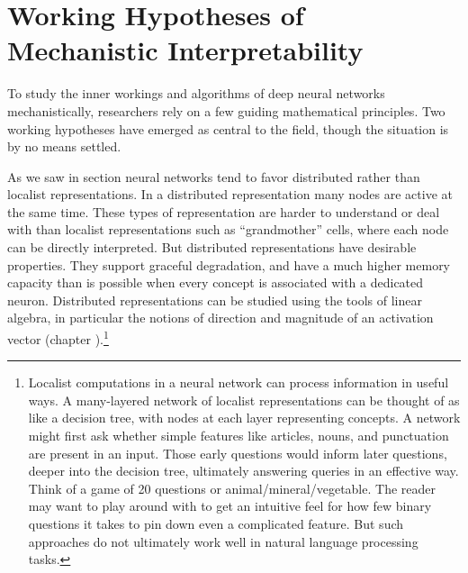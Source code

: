 \section{Working Hypotheses of Mechanistic Interpretability}\label{mechInterpHypotheses}

To study the inner workings and algorithms of deep neural networks
mechanistically, researchers rely on a few guiding mathematical principles. Two
working hypotheses have emerged as central to the field, though the situation
is by no means settled.


As we saw in section  neural networks tend to
favor distributed rather than localist representations. In a distributed
representation many nodes are active at the same time. These types of
representation are harder to understand or deal with than localist
representations such as ``grandmother'' cells, where each node can be directly
interpreted. But distributed  representations have desirable properties. They
support graceful degradation, and have a much higher memory capacity than is
possible when every concept is associated with a dedicated neuron.  Distributed
representations can be studied using the tools of linear algebra, in particular
the notions of direction and magnitude of an activation vector (chapter
).\footnote{Localist computations in a neural network
can process information in useful ways. A many-layered network of localist
representations can be thought of as like a decision tree, with nodes at each
layer representing concepts. A network might first ask whether simple features
like articles, nouns, and punctuation are present in an input. Those early
questions would inform later questions, deeper into the decision tree,
ultimately answering queries in an effective way. Think of a game of 20
questions or animal/mineral/vegetable. The reader may want to play around with
 to get an intuitive feel for how few binary
questions it takes to pin down even a complicated feature. But such approaches
do not ultimately work well in natural language processing tasks.} 

